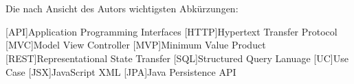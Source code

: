 \chapter*{\nameoflistofacronyms}

Die nach Ansicht des Autors wichtigsten Abkürzungen:
\bigskip

\begin{adjustwidth}{1.5em}{}
\begin{acronym}[AAAAA] %
	
	
	
	[API]{Application Programming Interfaces}
	[HTTP]{Hypertext Transfer Protocol}
	[MVC]{Model View Controller}
	[MVP]{Minimum Value Product}
	[REST]{Representational State Transfer}
	[SQL]{Structured Query Lanuage}
	[UC]{Use Case}
	[JSX]{JavaScript XML}
	[JPA]{Java Persistence API}

	
	
	
\end{acronym}	
\end{adjustwidth}
